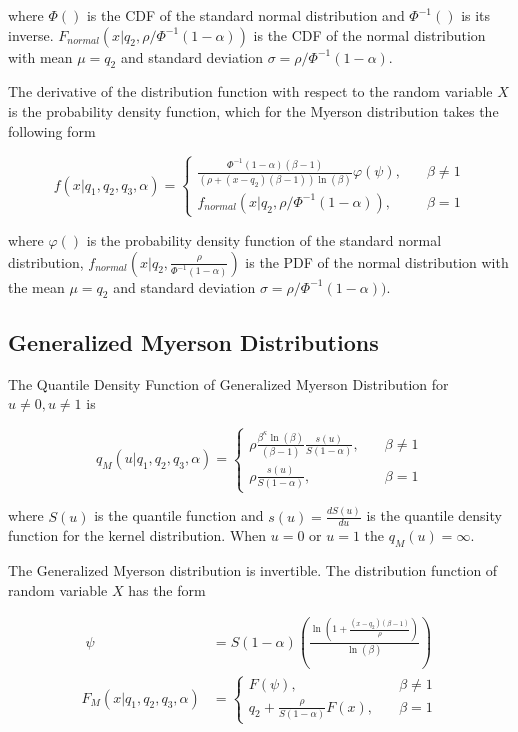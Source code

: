 \documentclass[
]{interact}
\begin{document}
where \(\Phi()\) is the CDF of the standard normal distribution and
\(\Phi^{-1}()\) is its inverse.
\(F_{normal}(x\vert q_2,\rho/\Phi^{-1}(1-\alpha))\) is the CDF of the
normal distribution with mean \(\mu=q_2\) and standard deviation
\(\sigma=\rho/\Phi^{-1}(1-\alpha)\).

The derivative of the distribution function with respect to the random
variable \(X\) is the probability density function, which for the
Myerson distribution takes the following form

\[
f(x\vert q_1, q_2, q_3, \alpha)=\begin{cases}
\frac{\Phi^{-1}(1-\alpha)(\beta-1)}{(\rho+(x-q_2)(\beta-1))\ln(\beta)}\varphi(\psi), \quad &\beta\neq1\\
f_{normal}(x\vert q_2,\rho/\Phi^{-1}(1-\alpha)),\quad &\beta=1
\end{cases}
\]

where \(\varphi()\) is the probability density function of the standard
normal distribution,
\(f_{normal}(x\vert q_2,\frac{\rho}{\Phi^{-1}(1-\alpha)})\) is the PDF
of the normal distribution with the mean \(\mu=q_2\) and standard
deviation \(\sigma=\rho/\Phi^{-1}(1-\alpha))\).

\subsection*{Generalized Myerson
Distributions}\label{generalized-myerson-distributions}

The Quantile Density Function of Generalized Myerson Distribution for
\(u\neq0, u\neq1\) is

\[
q_M(u\vert q_1,q_2,q_3,\alpha)=\begin{cases}
\rho\frac{\beta^\kappa\ln(\beta)}{(\beta-1)}\frac{s(u)}{S(1-\alpha)}, \quad &\beta \neq 1\\
\rho\frac{s(u)}{S(1-\alpha)}, \quad &\beta = 1
\end{cases}
\]

where \(S(u)\) is the quantile function and \(s(u)=\frac{dS(u)}{du}\) is
the quantile density function for the kernel distribution. When \(u=0\)
or \(u=1\) the \(q_M(u)=\infty\).

The Generalized Myerson distribution is invertible. The distribution
function of random variable \(X\) has the form

\[
\begin{aligned}\;
\psi &=S(1-\alpha)\left(\frac{\ln\left(1+\frac{(x-q_2)(\beta-1)}{\rho}\right)}{\ln(\beta)}\right)\\
F_M(x\vert q_1, q_2, q_3, \alpha)&=\begin{cases}
F(\psi), \quad &\beta\neq 1\\
q_2+ \frac{\rho}{S(1-\alpha)}F(x), \quad &\beta=1
\end{cases}
\end{aligned}
\]
\end{document}
